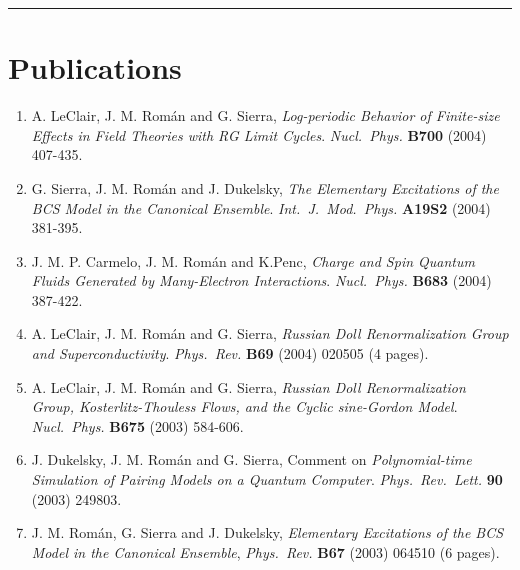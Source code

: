 \documentclass{article}
\begin{document}
\bigskip

\hrule

\newpage


\section*{Publications}

\begin{enumerate}

\item A. LeClair, J. M. Rom\'an and G. Sierra,
{\it Log-periodic Behavior of Finite-size Effects in Field Theories with RG Limit Cycles}.
{\it Nucl.~Phys.} {\bf B700} (2004) 407-435.

\item G. Sierra, J. M. Rom\'an and J. Dukelsky, 
{\it The Elementary Excitations of the BCS Model in the Canonical Ensemble}.
{\it Int.~J.~Mod.~Phys.} {\bf A19S2} (2004) 381-395.

\item J. M. P. Carmelo, J. M. Rom\'{a}n and K.Penc,
{\it Charge and Spin Quantum Fluids Generated by Many-Electron Interactions}.
{\it Nucl.~Phys.} {\bf B683} (2004) 387-422.

\item A. LeClair, J. M. Rom\'{a}n and G. Sierra, 
{\it Russian Doll Renormalization Group and Superconductivity}. 
{\it Phys.~Rev.} {\bf B69} (2004) 020505 (4 pages).

\item A. LeClair, J. M. Rom\'{a}n and G. Sierra, 
{\it Russian Doll Renormalization Group, Kosterlitz-Thouless Flows, 
and the Cyclic sine-Gordon Model}. 
{\it Nucl.~Phys.} {\bf B675} (2003) 584-606.

\item J. Dukelsky, J. M. Rom\'an and G. Sierra,
Comment on {\it Polynomial-time Simulation of Pairing Models 
on a Quantum Computer}.
{\it Phys.~Rev.~Lett.} {\bf 90} (2003) 249803.

\item J. M. Rom\'an, G. Sierra and J. Dukelsky, 
{\it Elementary Excitations of the BCS Model in the Canonical Ensemble},
{\it Phys.~Rev.} {\bf B67} (2003) 064510 (6 pages).


\end{enumerate}
\end{document}
